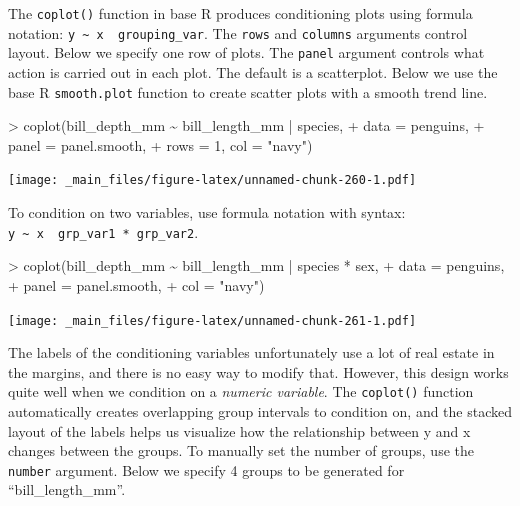 \documentclass[
]{book}
\newenvironment{Shaded}{\begin{snugshade}}{\end{snugshade}}
\newcommand{\AttributeTok}[1]{\textcolor[rgb]{0.77,0.63,0.00}{#1}}
\newcommand{\DecValTok}[1]{\textcolor[rgb]{0.00,0.00,0.81}{#1}}
\newcommand{\FunctionTok}[1]{\textcolor[rgb]{0.00,0.00,0.00}{#1}}
\newcommand{\NormalTok}[1]{#1}
\newcommand{\SpecialCharTok}[1]{\textcolor[rgb]{0.00,0.00,0.00}{#1}}
\newcommand{\StringTok}[1]{\textcolor[rgb]{0.31,0.60,0.02}{#1}}
\begin{document}
The \texttt{coplot()} function in base R produces conditioning plots using formula notation: \texttt{y\ \textasciitilde{}\ x\ \textbar{}\ grouping\_var}. The \texttt{rows} and \texttt{columns} arguments control layout. Below we specify one row of plots. The \texttt{panel} argument controls what action is carried out in each plot. The default is a scatterplot. Below we use the base R \texttt{smooth.plot} function to create scatter plots with a smooth trend line.

\begin{Shaded}
\begin{Highlighting}[]
\SpecialCharTok{\textgreater{}} \FunctionTok{coplot}\NormalTok{(bill\_depth\_mm }\SpecialCharTok{\textasciitilde{}}\NormalTok{ bill\_length\_mm }\SpecialCharTok{|}\NormalTok{ species, }
\SpecialCharTok{+}        \AttributeTok{data =}\NormalTok{ penguins,}
\SpecialCharTok{+}        \AttributeTok{panel =}\NormalTok{ panel.smooth,}
\SpecialCharTok{+}        \AttributeTok{rows =} \DecValTok{1}\NormalTok{, }\AttributeTok{col =} \StringTok{"navy"}\NormalTok{)}
\end{Highlighting}
\end{Shaded}

\texttt{[image: \_main\_files/figure-latex/unnamed-chunk-260-1.pdf]}

To condition on two variables, use formula notation with syntax: \texttt{y\ \textasciitilde{}\ x\ \textbar{}\ grp\_var1\ *\ grp\_var2}.

\begin{Shaded}
\begin{Highlighting}[]
\SpecialCharTok{\textgreater{}} \FunctionTok{coplot}\NormalTok{(bill\_depth\_mm }\SpecialCharTok{\textasciitilde{}}\NormalTok{ bill\_length\_mm }\SpecialCharTok{|}\NormalTok{ species }\SpecialCharTok{*}\NormalTok{ sex, }
\SpecialCharTok{+}        \AttributeTok{data =}\NormalTok{ penguins,}
\SpecialCharTok{+}        \AttributeTok{panel =}\NormalTok{ panel.smooth,}
\SpecialCharTok{+}        \AttributeTok{col =} \StringTok{"navy"}\NormalTok{)}
\end{Highlighting}
\end{Shaded}

\texttt{[image: \_main\_files/figure-latex/unnamed-chunk-261-1.pdf]}

The labels of the conditioning variables unfortunately use a lot of real estate in the margins, and there is no easy way to modify that. However, this design works quite well when we condition on a \emph{numeric variable}. The \texttt{coplot()} function automatically creates overlapping group intervals to condition on, and the stacked layout of the labels helps us visualize how the relationship between y and x changes between the groups. To manually set the number of groups, use the \texttt{number} argument. Below we specify 4 groups to be generated for ``bill\_length\_mm''.
\end{document}

